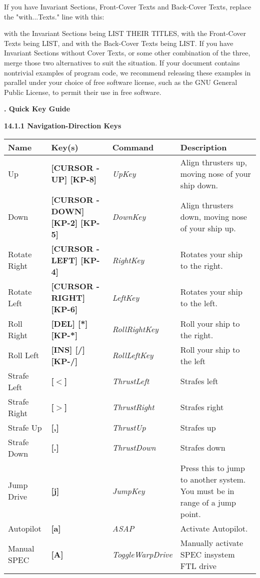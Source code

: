 \documentclass{article}
\begin{document}
If you have Invariant Sections, Front-Cover Texts and Back-Cover Texts, replace the "with...Texts." line with this: 

with the Invariant Sections being LIST THEIR TITLES, with the Front-Cover Texts being LIST, and with the Back-Cover Texts being LIST. If you have Invariant Sections without Cover Texts, or some other combination of the three, merge those two alternatives to suit the situation. If your document contains nontrivial examples of program code, we recommend releasing these examples in parallel under your choice of free software license, such as the GNU General Public License, to permit their use in free software. 

\textbf{}

\textbf{. Quick Key Guide }

\textbf{14.1.1 Navigation-Direction Keys }

\begin{tabular}{|p{0.8in}|p{0.6in}|p{1.0in}|p{2.4in}|} \hline 
\textbf{ Name } & \textbf{ Key(s) } & \textbf{ Command } & \textbf{Description } \\ \hline 
Up  & \textbf{[CURSOR -UP] [KP-8] } & \textit{UpKey } & Align thrusters up, moving nose of your ship down.  \\ \hline 
Down  & \textbf{[CURSOR -DOWN] [KP-2] [KP-5] } & \textit{DownKey } & Align thrusters down, moving nose of your ship up.  \\ \hline 
Rotate Right  & \textbf{[CURSOR -LEFT] [KP-4] } & \textit{RightKey } & Rotates your ship to the right.  \\ \hline 
Rotate Left  & \textbf{[CURSOR -RIGHT] [KP-6] } & \textit{LeftKey } & Rotates your ship to the left.  \\ \hline 
Roll Right  & \textbf{[DEL] [*] [KP-*] } & \textit{RollRightKey } & Roll your ship to the right.  \\ \hline 
Roll Left  & \textbf{[INS] [/] [KP-/] } & \textit{RollLeftKey } & Roll your ship to the left  \\ \hline 
Strafe Left  & \textbf{[$<$]} & \textit{\newline ThrustLeft } & Strafes left \\ \hline 
Strafe Right  & \textbf{[$>$]} & \textit{\newline ThrustRight } & Strafes right \\ \hline 
Strafe Up  & \textbf{[,]} & \textit{\newline ThrustUp } & Strafes up \\ \hline 
Strafe Down  & \textbf{[.]} & \textit{\newline ThrustDown } & Strafes down \\ \hline 
Jump Drive  & \textbf{[j] } & \textit{JumpKey } & Press this to jump to another system. You must be in range of a jump point.  \\ \hline 
Autopilot  & \textbf{ [a] } & \textit{ASAP} & Activate Autopilot.  \\ \hline 
Manual SPEC & \textbf{[A]} & \textit{ToggleWarpDrive} & Manually activate SPEC insystem FTL drive \\ \hline 
\end{tabular}
\end{document}
